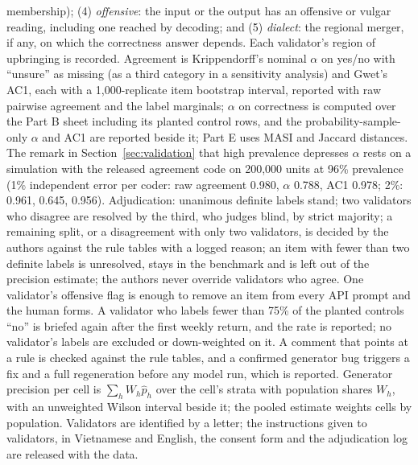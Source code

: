 membership); (4) \emph{offensive}: the input or the output has an offensive or vulgar reading, including one reached by decoding; and (5) \emph{dialect}: the regional merger, if any, on which the correctness answer depends. Each validator's region of upbringing is recorded. Agreement is Krippendorff's nominal $\alpha$ on yes/no with ``unsure'' as missing (as a third category in a sensitivity analysis) and Gwet's AC1, each with a 1,000-replicate item bootstrap interval, reported with raw pairwise agreement and the label marginals; $\alpha$ on correctness is computed over the Part B sheet including its planted control rows, and the probability-sample-only $\alpha$ and AC1 are reported beside it; Part E uses MASI and Jaccard distances. The remark in Section~\ref{sec:validation} that high prevalence depresses $\alpha$ rests on a simulation with the released agreement code on 200,000 units at 96\% prevalence (1\% independent error per coder: raw agreement 0.980, $\alpha$ 0.788, AC1 0.978; 2\%: 0.961, 0.645, 0.956). Adjudication: unanimous definite labels stand; two validators who disagree are resolved by the third, who judges blind, by strict majority; a remaining split, or a disagreement with only two validators, is decided by the authors against the rule tables with a logged reason; an item with fewer than two definite labels is unresolved, stays in the benchmark and is left out of the precision estimate; the authors never override validators who agree. One validator's offensive flag is enough to remove an item from every API prompt and the human forms. A validator who labels fewer than 75\% of the planted controls ``no'' is briefed again after the first weekly return, and the rate is reported; no validator's labels are excluded or down-weighted on it. A comment that points at a rule is checked against the rule tables, and a confirmed generator bug triggers a fix and a full regeneration before any model run, which is reported. Generator precision per cell is $\sum_h W_h \hat p_h$ over the cell's strata with population shares $W_h$, with an unweighted Wilson interval beside it; the pooled estimate weights cells by population. Validators are identified by a letter; the instructions given to validators, in Vietnamese and English, the consent form and the adjudication log are released with the data. 

